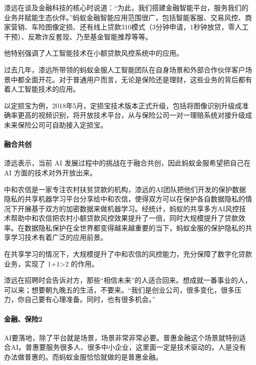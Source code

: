 \documentclass[letterpaper,11pt,english]{sphinxmanual}
\begin{document}
漆远在谈及金融科技的核心时说道：“为此，我们搭建金融智能平台，服务我们的业务并赋能生态伙伴。”蚂蚁金融智能应用范围很广，包括智能客服、交易风控、商家营销、车险图像定损、还有线上贷款310模式（3分钟申请，1秒钟放贷，零人工干预）、反欺诈反套现、乃至基金智能推荐等等。

他特别强调了人工智能技术在小额贷款风控系统中的应用。

过去几年，漆远所带领的蚂蚁金服人工智能团队在自身场景和外部合作伙伴客户场景中都全面开花。对于普通用户而言，无论是保险还是理财，这些业务的背后都有着人工智能技术的应用。

以定损宝为例，2018年5月，定损宝技术版本正式升级，包括将图像识别升级成准确率更高的视频识别，将开放技术平台，从与保险公司一对一理赔系统对接升级成未来保险公司可自助接入定损宝。


\paragraph{融合共创}
\label{\detokenize{chapter_dive/qi_yuan:id4}}
漆远表示，当前 AI 发展过程中的挑战在于融合共创，因此蚂蚁金服希望把自己在
AI 方面的技术对外开放出来。

中和农信是一家专注农村扶贫贷款的机构，漆远的AI团队把他们开发的保护数据隐私的共享机器学习平台分享给中和农信，使得双方可以在保护各自数据隐私的情况下开展基于双方的加密数据来做机器学习。经统计，蚂蚁的共享多方AI风控技术帮助中和农信把农村小额贷款风控效果提升了一倍，同时大规模提升了贷款效率。在数据隐私保护在全世界都变得越来越重要的当下，蚂蚁金服的保护隐私的共享学习技术有着广泛的应用前景。

在共享学习的情况下，大规模提升了中和农信的风控能力，充分保障了数字化贷款业务，实现了
1+1>2 的作用。

漆远在招聘时会告诉对方，那些“相信未来”的人适合回来。想成就一番事业的人，可以来；想要朝九晚五的生活，不要来。“我们是创业公司，很多变化，很多压力，你自己要有心理准备。同时，也有很多机会。”


\paragraph{金融、保险2\sphinxfootnotemark[303]}
\label{\detokenize{chapter_dive/qi_yuan:id5}}%
\begin{footnotetext}[303]\sphinxAtStartFootnote
{}
%
\end{footnotetext}\ignorespaces 
AI要落地，除了平台就是场景，场景非常非常必要。普惠金融这个场景就特别适合AI。普惠要服务很多人、很多中小企业，这里面一定是技术驱动的。人是没有办法做普惠的。而蚂蚁金服恰恰就做的是普惠金融。
\end{document}
